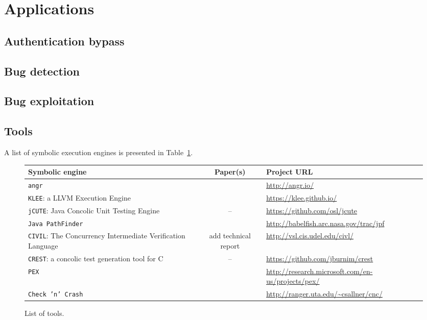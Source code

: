 
\section{Applications}

\subsection{Authentication bypass}
\cite{FIRMALICE-NDSS15}

\subsection{Bug detection}
\cite{DRILLER-NDSS16}

\subsection{Bug exploitation}
\cite{MAYHEM-SP12}

\subsection{Tools}
A list of symbolic execution engines is presented in Table~\ref{tab:symbolic-engines}.

\begin{figure}[t]
  \centering
  \begin{adjustbox}{width=1\columnwidth}
  \begin{small}
  \begin{tabular}{| l || c || l |}
    \hline      
    Symbolic engine & Paper(s) & Project URL  \\ \hline\hline
    {\tt angr} & \cite{FIRMALICE-NDSS15} & \url{http://angr.io/} \\
    {\tt KLEE}: a LLVM Execution Engine & \cite{KLEE-OSDI08} & \url{https://klee.github.io/} \\
    {\tt jCUTE}: Java Concolic Unit Testing Engine & -- & \url{https://github.com/osl/jcute} \\
    {\tt Java PathFinder} & \cite{PATHFINDER-ASE10} & \url{http://babelfish.arc.nasa.gov/trac/jpf}\\
    {\tt CIVIL}: The Concurrency Intermediate Verification Language & add technical report & \url{http://vsl.cis.udel.edu/civl/}\\
    {\tt CREST}: a concolic test generation tool for C & -- & \url{https://github.com/jburnim/crest} \\
    {\tt PEX} & \cite{PEX-TAP08} & \url{http://research.microsoft.com/en-us/projects/pex/} \\
    {\tt Check 'n' Crash} & \cite{CS-ICSE05} & \url{http://ranger.uta.edu/~csallner/cnc/}\\
    \hline  
  \end{tabular}
  \end{small}
  \end{adjustbox}
  \caption{List of tools.}
  \label{tab:symbolic-engines}
\end{figure}